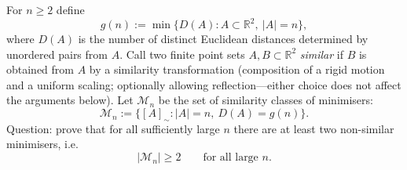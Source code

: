 For $n\ge 2$ define
\[
g(n):=\min\{D(A): A\subset\mathbb{R}^2,\ |A|=n\},
\]
where $D(A)$ is the number of distinct Euclidean distances determined by unordered pairs from $A$.
Call two finite point sets $A,B\subset\mathbb{R}^2$ \emph{similar} if $B$ is obtained from $A$ by a similarity transformation (composition of a rigid motion and a uniform scaling; optionally allowing reflection---either choice does not affect the arguments below).
Let $\mathcal{M}_n$ be the set of similarity classes of minimisers:
\[
\mathcal{M}_n:=\{[A]_{\sim}: |A|=n,\ D(A)=g(n)\}.
\]
Question: prove that for all sufficiently large $n$ there are at least two non-similar minimisers, i.e.
\[
|\mathcal{M}_n|\ge 2\qquad\text{for all large }n.
\]

